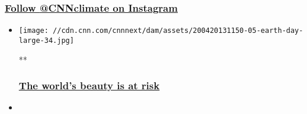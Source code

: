 \begin{itemize}
{  \subsubsection{\texorpdfstring{\href{https://www.instagram.com/cnnclimate/}{Follow
  \textbf{@CNNclimate} on
  Instagram}}{Follow @CNNclimate on Instagram}}\label{follow-cnnclimate-on-instagram}}
\end{itemize}

\begin{itemize}
\item
  \href{/2020/04/21/weather/gallery/earth-day-landscapes/index.html}{}

  \texttt{[image: //cdn.cnn.com/cnnnext/dam/assets/200420131150-05-earth-day-large-34.jpg]}

  **

  \hypertarget{the-worlds-beauty-is-at-risk}{%
  \subsubsection{\texorpdfstring{\href{/2020/04/21/weather/gallery/earth-day-landscapes/index.html}{\textbf{The
  world's beauty is at
  risk}}}{The world's beauty is at risk}}\label{the-worlds-beauty-is-at-risk}}
\end{itemize}

\begin{itemize}
\item
\end{itemize}

